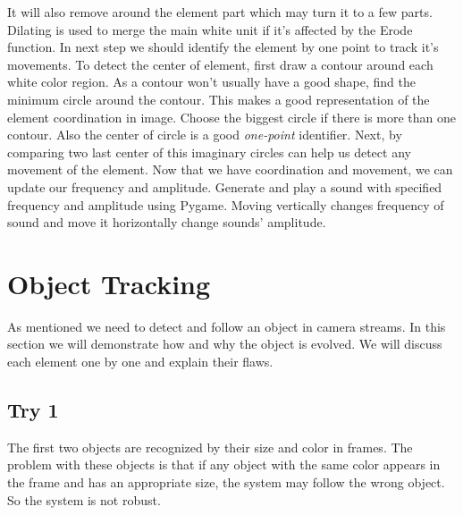   It will also remove around the element part which may turn it to a few parts. Dilating is used to merge the main white unit if it's affected by the Erode function. In next step we should identify the element by one point to track it's movements. To detect the center of element, first draw a contour around each white color region. As a contour won't usually have a good shape, find the minimum circle around the contour. This makes a good representation of the element coordination in image. Choose the biggest circle if there is more than one contour. Also the center of circle is a good \textit{one-point} identifier. \newline
Next, by comparing two last center of this imaginary circles can help us detect any movement of the element. Now that we have coordination and movement, we can update our frequency and amplitude. Generate and play a sound with specified frequency and amplitude using Pygame. Moving vertically changes frequency of sound and move it horizontally change sounds' amplitude.  \newline

\section{Object Tracking}
As mentioned we need to detect and follow an object in camera streams. In this section we will demonstrate how and why the object is evolved. We will discuss each element one by one and explain their flaws.

\subsection{Try 1}
The first two objects are recognized by their size and color in frames. The problem with these objects is that if any object with the same color appears in the frame and has an appropriate size, the system may follow the wrong object. So the system is not robust.

